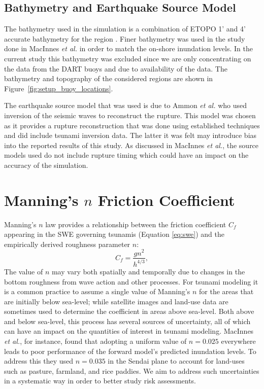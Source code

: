 \subsection{Bathymetry and Earthquake Source Model}

The bathymetry used in the simulation is a combination of ETOPO 1' and 4'
accurate bathymetry for the region \cite{Amante:2009ud}.  Finer bathymetry was
used in the study done in MacInnes \emph{et al.} in order to match the on-shore
inundation levels.  In the current study this bathymetry was excluded since we
are only concentrating on the data from the DART buoys and due to availability
of the data.  The bathymetry and topography of the considered regions are 
shown in Figure~\ref{fig:setup_buoy_locations}.

The earthquake source model that was used is due to Ammon \emph{et al.}
\cite{Ammon:2011dm} who used inversion of the seismic waves to reconstruct the
rupture.  This model was chosen as it provides a rupture reconstruction that was
done using established techniques and did include tsunami inversion data.  The
latter it was felt may introduce bias into the reported results of this study.
As discussed in MacInnes \emph{et al.}, the source models used do not include
rupture timing which could have an impact on the accuracy of the simulation.


\section{Manning's $n$ Friction Coefficient} \label{sec:manning}

Manning's $n$ law provides a relationship between the friction coefficient
$C_f$ appearing in the SWE governing tsunamis (Equation \ref{eq:swe}) and 
the empirically derived roughness parameter $n$:
\begin{equation}
    C_f = \frac{g n^2}{h^{4/3}},
\label{eq:coef}
\end{equation}
The value of $n$ may vary both spatially and temporally due to changes in the
bottom roughness from wave action and other processes.  For tsunami modeling it
is a common practice to assume a single value of Manning's $n$ for the areas
that are initially below sea-level; while satellite images and 
land-use data are sometimes used to determine the coefficient in areas above sea-level.  
Both above and below sea-level, this process has several sources of uncertainty, all
of which can have an impact on the quantities of interest in tsunami modeling.   
MacInnes \emph{et al.}, for instance, found that adopting a uniform value 
of $n = 0.025$ everywhere leads to poor performance of the forward model's predicted 
inundation levels.  To address this they used $n = 0.035$ in the Sendai plane to 
account for land-uses such as pasture, farmland, and rice paddies.  We aim to address such
uncertainties in a systematic way in order to better study risk assessments.


